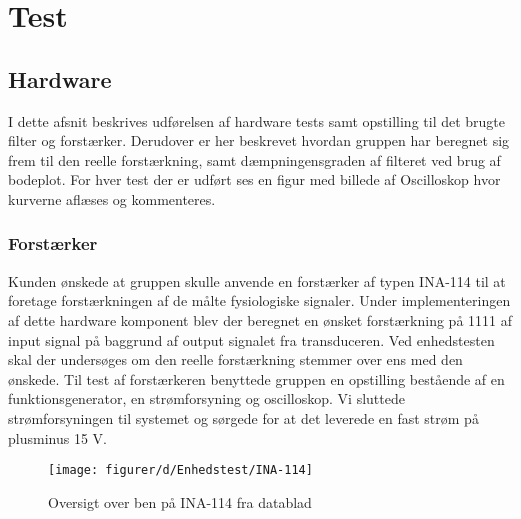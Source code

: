 \chapter{Test}\label{kapTest}

\section{Hardware}
I dette afsnit beskrives udførelsen af hardware tests samt opstilling til det brugte filter og forstærker. Derudover er her beskrevet hvordan gruppen har beregnet sig frem til den reelle forstærkning, samt dæmpningensgraden af filteret ved brug af bodeplot. 
For hver test der er udført ses en figur med billede af Oscilloskop hvor kurverne aflæses og kommenteres.    

\subsection{Forstærker}

Kunden ønskede at gruppen skulle anvende en forstærker af typen INA-114 til at foretage forstærkningen af de målte fysiologiske signaler. Under implementeringen af dette hardware komponent blev der beregnet en ønsket forstærkning på 1111 af input signal på baggrund af output signalet fra transduceren. 
Ved enhedstesten skal der undersøges om den reelle forstærkning stemmer over ens med den ønskede. 
Til test af forstærkeren benyttede gruppen en opstilling bestående af en funktionsgenerator, en strømforsyning og oscilloskop. 
Vi sluttede strømforsyningen til systemet og sørgede for at det leverede en fast strøm på plusminus 15 V.

\begin{figure}[H]
    \centering
    \texttt{[image: figurer/d/Enhedstest/INA-114]}
   \caption{Oversigt over ben på INA-114 fra datablad}
   \label{figtest_INA-114}
\end{figure}
 
